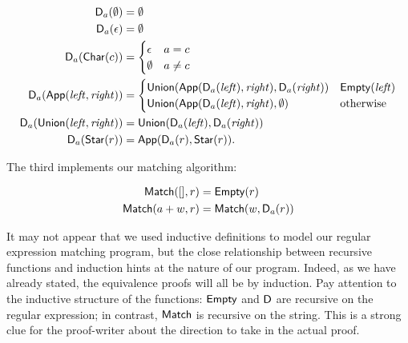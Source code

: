 \begin{align*}
    \mathsf{D}_a(\emptyset) &= \emptyset \\
    \mathsf{D}_a(\epsilon) &= \emptyset \\
    \mathsf{D}_a(\mathsf{Char}(c)) &= \begin{cases}
        \epsilon & a = c \\
        \emptyset & a \neq c
    \end{cases} \\
    \mathsf{D}_a(\mathsf{App}(\mathit{left}, \mathit{right})) &= \begin{cases}
        \mathsf{Union}(\mathsf{App}(\mathsf{D}_a(\mathit{left}), \mathit{right}),
                     \mathsf{D}_a(\mathit{right})) & \mathsf{Empty}(\mathit{left}) \\
        \mathsf{Union}(\mathsf{App}(\mathsf{D}_a(\mathit{left}), \mathit{right}),
                     \emptyset) & \text{otherwise}
    \end{cases} \\
    \mathsf{D}_a(\mathsf{Union}(\mathit{left}, \mathit{right})) &=
        \mathsf{Union}(\mathsf{D}_a(\mathit{left}), \mathsf{D}_a(\mathit{right})) \\
    \mathsf{D}_a(\mathsf{Star}(r)) &= \mathsf{App}(\mathsf{D}_a(r), \mathsf{Star}(r)).
\end{align*}

The third implements our matching algorithm:

\begin{align*}
    \mathsf{Match}([], r) &= \mathsf{Empty}(r) \\
    \mathsf{Match}(a+w, r) &= \mathsf{Match}(w, \mathsf{D}_a(r))
\end{align*}

It may not appear that we used inductive definitions to model our regular
expression matching program, but the close relationship between recursive
functions and induction hints at the nature of our program. Indeed, as we have
already stated, the equivalence proofs will all be by induction. Pay attention
to the inductive structure of the functions: \(\mathsf{Empty}\) and \(\mathsf{D}\)
are recursive on the regular expression; in contrast, \(\mathsf{Match}\) is
recursive on the string. This is a strong clue for the proof-writer about the
direction to take in the actual proof.

